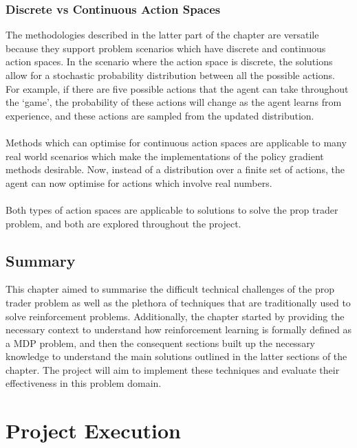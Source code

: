 \documentclass[ %
                    author={Ashwinder Khurana},
                supervisor={Prof Dave Cliff},
                    degree={MEng},
                     title={The Deeply Reinforced Trader},
                  subtitle={},
                      type={enterprise},
                      year={2020} ]{dissertation}
\begin{document}
{\subsection{Discrete vs Continuous Action Spaces}
\label{subsection:Discrete Vs Continuous Action Spaces}
The methodologies described in the latter part of the chapter are versatile because they support problem scenarios which have discrete and continuous action spaces. In the scenario where the action space is discrete, the solutions allow for a stochastic probability distribution between all the possible actions. For example, if there are five possible actions that the agent can take throughout the \enquote*{game}, the probability of these actions will change as the agent learns from experience, and these actions are sampled from the updated distribution. 
\\
\\
Methods which can optimise for continuous action spaces are applicable to many real world scenarios which make the implementations of the policy gradient methods desirable. Now, instead of a distribution over a finite set of actions, the agent can now optimise for actions which involve real numbers.
\\
\\
\noindent
Both types of action spaces are applicable to solutions to solve the prop trader problem, and both are explored throughout the project.

\section{Summary}
\noindent
This chapter aimed to summarise the difficult technical challenges of the prop trader problem as well as the plethora of techniques that are traditionally used to solve reinforcement problems. Additionally, the chapter started by providing the necessary context to understand how reinforcement learning is formally defined as a MDP problem, and then the consequent sections built up the necessary knowledge to understand the main solutions outlined in the latter sections of the chapter. The project will aim to implement these techniques and evaluate their effectiveness in this problem domain. 


\chapter{Project Execution}
\label{chap:execution}


}
\end{document}
